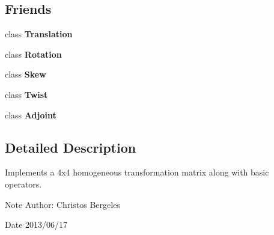 \subsection*{Friends}
\begin{DoxyCompactItemize}
\item 
\hypertarget{class_homogeneous_transform_a750420852e1c43779a3e6de1b3a9f158}{class {\bfseries Translation}}\label{class_homogeneous_transform_a750420852e1c43779a3e6de1b3a9f158}

\item 
\hypertarget{class_homogeneous_transform_aa9d2bf0f1d1d2655fb37b513d3159be3}{class {\bfseries Rotation}}\label{class_homogeneous_transform_aa9d2bf0f1d1d2655fb37b513d3159be3}

\item 
\hypertarget{class_homogeneous_transform_a5750c7b2ceae5b508e20e6ad5193433b}{class {\bfseries Skew}}\label{class_homogeneous_transform_a5750c7b2ceae5b508e20e6ad5193433b}

\item 
\hypertarget{class_homogeneous_transform_a5372d90dc99e27198192a07365c7e09e}{class {\bfseries Twist}}\label{class_homogeneous_transform_a5372d90dc99e27198192a07365c7e09e}

\item 
\hypertarget{class_homogeneous_transform_a22c177c74e1b9759be2a123b988235d5}{class {\bfseries Adjoint}}\label{class_homogeneous_transform_a22c177c74e1b9759be2a123b988235d5}

\end{DoxyCompactItemize}


\subsection{Detailed Description}
Implements a 4x4 homogeneous transformation matrix along with basic operators. 

\begin{DoxyNote}{Note}
Author\+: Christos Bergeles 
\end{DoxyNote}
\begin{DoxyDate}{Date}
2013/06/17 
\end{DoxyDate}


